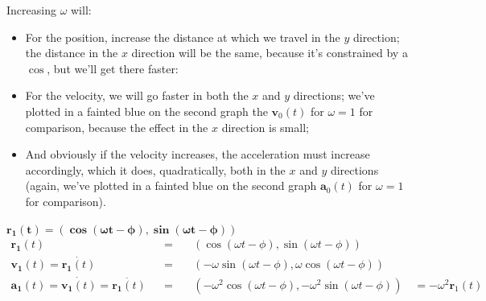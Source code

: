 \documentclass[solutions.tex]{subfiles}
\begin{document}
\begin{remark} Increasing $\omega$ will:
\begin{itemize}
	\item For the position, increase the distance at which we travel in the
	$y$ direction; the distance in the $x$ direction will be the same, because
	it's constrained by a $\cos$, but we'll get there faster:
	\item For the velocity, we will go faster in both the $x$ and $y$
	directions; we've plotted in a fainted blue on the second graph
	the $\bm{v}_0(t)$ for $\omega=1$ for comparison, because the effect
	in the $x$ direction is small;
	\item And obviously if the velocity increases, the acceleration must
	increase accordingly, which it does, quadratically, both in the $x$
	and $y$ directions (again, we've plotted in a fainted blue on the
	second graph $\bm{a}_0(t)$ for $\omega=1$ for comparison).
\end{itemize}
\end{remark}

\hr
$\bm{r_1(t) = (\cos(\omega t-\phi), \sin(\omega t-\phi))}$\ \\

\begin{equation*} \begin{aligned}
	\bm{r_1}(t) &&=\quad&
		(\cos(\omega t-\phi), \sin(\omega t-\phi)) \\
	\bm{v_1}(t) = \dot{\bm{r_1}(t)} &&=\quad&
		\boxed{(-\omega\sin(\omega t-\phi), \omega\cos(\omega t-\phi))} \\
	\bm{a_1}(t) = \dot{\bm{v_1}(t)} = \ddot{\bm{r_1}(t)} &&=\quad&
		\boxed{(-\omega^2\cos(\omega t-\phi), -\omega^2\sin(\omega t-\phi))}
		\quad= -\omega^2\bm{r}_1(t)
\end{aligned} \end{equation*}
\end{document}

